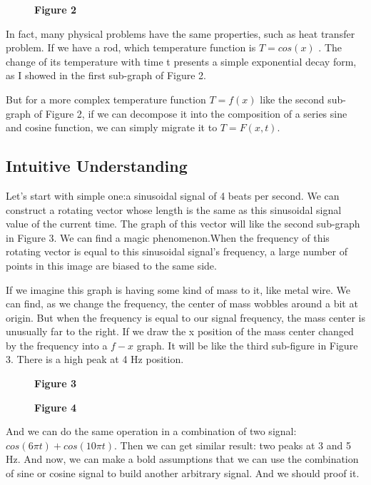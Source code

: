 \documentclass[margin,line]{res}
\begin{document}
\begin{resume}
\begin{figure}[H]
\begin{minipage}{0.55\linewidth}
    \centerline{\textbf{Figure 2}}
  \end{minipage}
\end{figure}
In fact, many physical problems have the same properties, such as heat transfer problem. If we have a rod, which temperature function is $T=cos(x)$ .
The change of its temperature with time t presents a simple exponential decay form, as I showed in the first sub-graph of Figure 2.\par
But for a more complex temperature function $T=f(x)$ like the second sub-graph of Figure 2, if we can decompose it into the composition of a series sine and cosine function, we can simply migrate it to $T=F(x,t)$.

\subsection{\textbf{Intuitive Understanding}}

Let's start with simple one:a sinusoidal signal of 4 beats per second. We can construct a rotating vector whose length is the same as this sinusoidal signal value of the current time. The graph of this vector will like the second sub-graph in Figure 3. We can find a magic phenomenon.When the frequency of this rotating vector is equal to this sinusoidal signal's frequency, a large number of points in this image are biased to the same side.\par
If we imagine this graph is having some kind of mass to it, like metal wire. We can find, as we change the frequency, the center of mass wobbles around a bit at origin. But when the frequency is equal to our signal frequency, the mass center is unusually far to the right. If we draw the x position of the mass center changed by the frequency into a $f-x$ graph. It will be like the third sub-figure in Figure 3. There is a high peak at 4 Hz position.\par
\begin{figure}[H]
	\begin{minipage}{0.48\linewidth}
		\centerline{}
		\centerline{\textbf{Figure 3}}
	\end{minipage}
	\begin{minipage}{0.48\linewidth}
		\centerline{}
		\centerline{\textbf{Figure 4}}
	\end{minipage}
\end{figure}
And we can do the same operation in a combination of two signal: $cos(6\pi t)+cos(10\pi t)$. Then we can get similar result: two peaks at 3 and 5 Hz. And now, we can make a bold assumptions that we can use the combination of sine or cosine signal to build another arbitrary signal. And we should proof it.


\end{resume}
\end{document}
